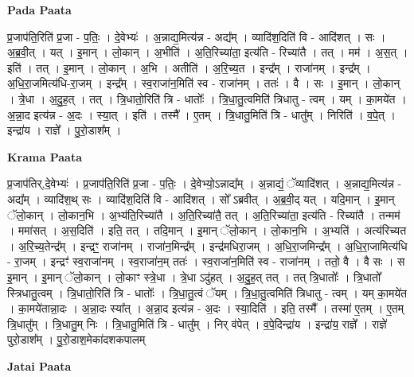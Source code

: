 \documentclass[17pt]{extarticle}
\begin{document}
\textbf{Pada Paata} \newline

प्र॒जाप॑ति॒रिति॑ प्र॒जा - प॒तिः॒ । दे॒वेभ्यः॑ । अ॒न्नाद्य॒मित्य॑न्न - अद्य᳚म् । व्यादि॑श॒दिति॑ वि - आदि॑शत् । सः । अ॒ब्र॒वी॒त् । यत् । इ॒मान् । लो॒कान् । अ॒भीति॑ । अ॒ति॒रिच्या॑ता॒ इत्य॑ति - रिच्या॑तै । तत् । मम॑ । अ॒स॒त् । इति॑ । तत् । इ॒मान् । लो॒कान् । अ॒भि । अतीति॑ । अ॒रि॒च्य॒त । इन्द्र᳚म् । राजा॑नम् । इन्द्र᳚म् । अ॒धि॒रा॒जमित्य॑धि-रा॒जम् ।   इन्द्र᳚म् । स्व॒राजा॑न॒मिति॑ स्व - राजा॑नम् । ततः॑ । वै । सः । इ॒मान् । लो॒कान् । त्रे॒धा । अ॒दु॒ह॒त् । तत् । त्रि॒धातो॒रिति॑ त्रि - धातोः᳚ । त्रि॒धा॒तु॒त्वमिति॑ त्रिधातु - त्वम् । यम् । का॒मये॑त । अ॒न्ना॒द इत्य॑न्न - अ॒दः । स्या॒त् । इति॑ । तस्मै᳚ । ए॒तम् । त्रि॒धातु॒मिति॑ त्रि - धातु᳚म् । निरिति॑ । व॒पे॒त् । इन्द्रा॑य । राज्ञे᳚ । पु॒रो॒डाश᳚म् ।  \newline


\textbf{Krama Paata} \newline

प्र॒जाप॑तिर्,दे॒वेभ्यः॑ । प्र॒जाप॑ति॒रिति॑ प्र॒जा - प॒तिः॒ । दे॒वेभ्यो॒ऽन्नाद्य᳚म् । अ॒न्नाद्यं॒ ॅव्यादि॑शत् । अ॒न्नाद्य॒मित्य॑न्न - अद्य᳚म् । व्यादि॑श॒थ् सः । व्यादि॑श॒दिति॑ वि - आदि॑शत् । सो᳚ ऽब्रवीत् । अ॒ब्र॒वी॒द् यत् । यदि॒मान् । इ॒मान् ॅलो॒कान् । लो॒कान॒भि । अ॒भ्य॑ति॒रिच्या॑तै । अ॒ति॒रिच्या॑तै॒ तत् । अ॒ति॒रिच्या॑ता॒ इत्य॑ति - रिच्या॑तै । तन्मम॑ । ममा॑सत् । अ॒स॒दिति॑ । इति॒ तत् । तदि॒मान् । इ॒मान् ॅलो॒कान् । लो॒कान॒भि । अ॒भ्यति॑ । अत्य॑रिच्यत । अ॒रि॒च्य॒तेन्द्र᳚म् । इन्द्रꣳ॒॒ राजा॑नम् । राजा॑न॒मिन्द्र᳚म् । इन्द्र॑मधिरा॒जम् । अ॒धि॒रा॒जमिन्द्र᳚म् । अ॒धि॒रा॒जामित्य॑धि - रा॒जम् । इन्द्रꣳ॑ स्व॒राजा॑नम् । स्व॒राजा॑न॒म् ततः॑ । स्व॒राजा॑न॒मिति॑ स्व - राजा॑नम् । ततो॒ वै । वै सः । स इ॒मान् । इ॒मान् ॅलो॒कान् । लो॒काꣳ स्त्रे॒धा । त्रे॒धा ऽदु॑हत् । अ॒दु॒ह॒त् तत् । तत् त्रि॒धातोः᳚ । त्रि॒धातो᳚ स्त्रिधातु॒त्वम् । त्रि॒धातो॒रिति॑ त्रि - धातोः᳚ । त्रि॒धा॒तु॒त्वं ॅयम् । त्रि॒धा॒तु॒त्वमिति॑ त्रिधातु - त्वम् । यम् का॒मये॑त । का॒मये॑तान्ना॒दः । अ॒न्ना॒दः स्या᳚त् । अ॒न्ना॒द इत्य॑न्न - अ॒दः । स्या॒दिति॑ । इति॒ तस्मै᳚ । तस्मा॑ ए॒तम् । ए॒तम् त्रि॒धातु᳚म् । त्रि॒धातु॒म् निः । त्रि॒धातु॒मिति॑ त्रि - धातु᳚म् । निर् व॑पेत् । व॒पे॒दिन्द्रा॑य । इन्द्रा॑य॒ राज्ञे᳚ । राज्ञे॑ पुरो॒डाश᳚म् । पु॒रो॒डाश॒मेका॑दशकपालम् \newline

\textbf{Jatai Paata} \newline
\end{document}
